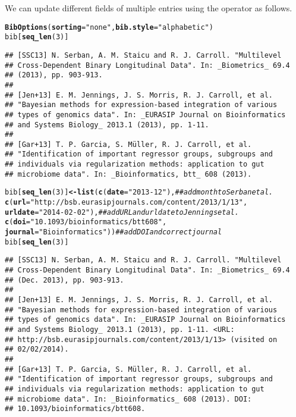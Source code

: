 \documentclass[article]{jss}\usepackage[]{graphicx}\usepackage[]{color}
\makeatletter
\newcommand{\hlnum}[1]{\textcolor[rgb]{0.125,0.125,1}{#1}}%
\newcommand{\hlstr}[1]{\textcolor[rgb]{0.125,0.125,1}{#1}}%
\newcommand{\hlcom}[1]{\textcolor[rgb]{1,0,0.753}{\textit{#1}}}%
\newcommand{\hlstd}[1]{\textcolor[rgb]{0.251,0.251,0.282}{#1}}%
\newcommand{\hlkwb}[1]{\textcolor[rgb]{0.439,0.251,1}{\textbf{#1}}}%
\newcommand{\hlkwc}[1]{\textcolor[rgb]{0.529,0,0.184}{\textbf{#1}}}%
\newcommand{\hlkwd}[1]{\textcolor[rgb]{0.251,0.251,0.282}{\textbf{#1}}}%
\newenvironment{kframe}{%
 \def\at@end@of@kframe{}%
 \ifinner\ifhmode%
  \def\at@end@of@kframe{\end{minipage}}%
  \begin{minipage}{\columnwidth}%
 \fi\fi%
 \def\FrameCommand##1{\hskip\@totalleftmargin \hskip-\fboxsep
 \colorbox{shadecolor}{##1}\hskip-\fboxsep
     \hskip-\linewidth \hskip-\@totalleftmargin \hskip\columnwidth}%
 \MakeFramed {\advance\hsize-\width
   \@totalleftmargin\z@ \linewidth\hsize
   \@setminipage}}%
 {\par\unskip\endMakeFramed%
 \at@end@of@kframe}
\newenvironment{knitrout}{}{} %
\newcommand{\bt}{\`{}}
\makeatother
\begin{document}
We can update different fields of multiple entries using the operator \code{\bt[<-\bt} as follows.
\begin{knitrout}
\color{fgcolor}\begin{kframe}
\begin{alltt}
\hlkwd{BibOptions}\hlstd{(}\hlkwc{sorting} \hlstd{=} \hlstr{"none"}\hlstd{,} \hlkwc{bib.style} \hlstd{=} \hlstr{"alphabetic"}\hlstd{)}
\hlstd{bib[}\hlkwd{seq_len}\hlstd{(}\hlnum{3}\hlstd{)]}
\end{alltt}
\begin{verbatim}
## [SSC13] N. Serban, A. M. Staicu and R. J. Carroll. "Multilevel
## Cross-Dependent Binary Longitudinal Data". In: _Biometrics_ 69.4
## (2013), pp. 903-913.
## 
## [Jen+13] E. M. Jennings, J. S. Morris, R. J. Carroll, et al.
## "Bayesian methods for expression-based integration of various
## types of genomics data". In: _EURASIP Journal on Bioinformatics
## and Systems Biology_ 2013.1 (2013), pp. 1-11.
## 
## [Gar+13] T. P. Garcia, S. Müller, R. J. Carroll, et al.
## "Identification of important regressor groups, subgroups and
## individuals via regularization methods: application to gut
## microbiome data". In: _Bioinformatics, btt_ 608 (2013).
\end{verbatim}
\begin{alltt}
\hlstd{bib[}\hlkwd{seq_len}\hlstd{(}\hlnum{3}\hlstd{)]} \hlkwb{<-} \hlkwd{list}\hlstd{(}\hlkwd{c}\hlstd{(}\hlkwc{date}\hlstd{=}\hlstr{"2013-12"}\hlstd{),} \hlcom{## add month to Serban et al.}
        \hlkwd{c}\hlstd{(}\hlkwc{url}\hlstd{=}\hlstr{"http://bsb.eurasipjournals.com/content/2013/1/13"}\hlstd{,}
          \hlkwc{urldate} \hlstd{=} \hlstr{"2014-02-02"}\hlstd{),} \hlcom{## add URL and urldate to Jennings et al.}
        \hlkwd{c}\hlstd{(}\hlkwc{doi}\hlstd{=}\hlstr{"10.1093/bioinformatics/btt608"}\hlstd{,}
          \hlkwc{journal} \hlstd{=} \hlstr{"Bioinformatics"}\hlstd{))} \hlcom{## add DOI and correct journal}
\hlstd{bib[}\hlkwd{seq_len}\hlstd{(}\hlnum{3}\hlstd{)]}
\end{alltt}
\begin{verbatim}
## [SSC13] N. Serban, A. M. Staicu and R. J. Carroll. "Multilevel
## Cross-Dependent Binary Longitudinal Data". In: _Biometrics_ 69.4
## (Dec. 2013), pp. 903-913.
## 
## [Jen+13] E. M. Jennings, J. S. Morris, R. J. Carroll, et al.
## "Bayesian methods for expression-based integration of various
## types of genomics data". In: _EURASIP Journal on Bioinformatics
## and Systems Biology_ 2013.1 (2013), pp. 1-11. <URL:
## http://bsb.eurasipjournals.com/content/2013/1/13> (visited on
## 02/02/2014).
## 
## [Gar+13] T. P. Garcia, S. Müller, R. J. Carroll, et al.
## "Identification of important regressor groups, subgroups and
## individuals via regularization methods: application to gut
## microbiome data". In: _Bioinformatics_ 608 (2013). DOI:
## 10.1093/bioinformatics/btt608.
\end{verbatim}
\end{kframe}
\end{knitrout}
\end{document}
